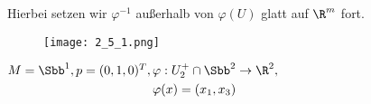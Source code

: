 \begin{rem*}	
	Hierbei setzen wir $ \varphi^{-1} $ außerhalb von $ \varphi(U) $ glatt auf $\R^m$ fort.
\end{rem*}

\begin{exmp*}
	\begin{minipage}{\linewidth}
		\begin{wrapfigure}{R}{0.3\textwidth}
			\texttt{[image: 2\_5\_1.png]}
		\end{wrapfigure}
		$ M = \Sbb^1, p = (0,1,0)^T, \begin{aligned}[t]
			&\varphi: U_2^+ \cap \Sbb^2 \to \R^2, \\&\varphi(x) = (x_1,x_3)
		\end{aligned} $
	\end{minipage}
		

\end{exmp*}
